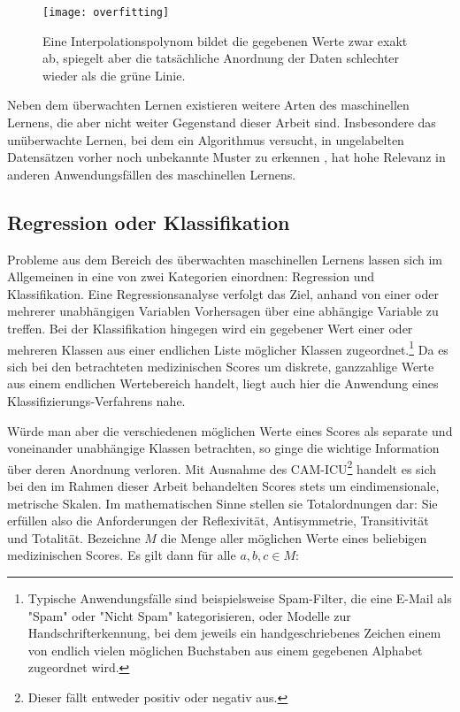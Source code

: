 \begin{figure}[htb]
    \centering
    \texttt{[image: overfitting]}
    \caption{Eine Interpolationspolynom bildet die gegebenen Werte zwar exakt ab, spiegelt aber die tatsächliche Anordnung der Daten schlechter wieder als die grüne Linie.}
    \label{fig:overfitting}
\end{figure} %

Neben dem überwachten Lernen existieren weitere Arten des maschinellen Lernens, die aber nicht weiter Gegenstand dieser Arbeit sind. Insbesondere das unüberwachte Lernen, bei dem ein Algorithmus versucht, in ungelabelten Datensätzen vorher noch unbekannte Muster zu erkennen \citep{russellArtificialIntelligenceModern2020}, hat hohe Relevanz in anderen Anwendungsfällen des maschinellen Lernens.

\subsection{Regression oder Klassifikation}\label{section:regrvsclf}
Probleme aus dem Bereich des überwachten maschinellen Lernens lassen sich im Allgemeinen in eine von zwei Kategorien einordnen: Regression und Klassifikation. Eine Regressionsanalyse verfolgt das Ziel, anhand von einer oder mehrerer unabhängigen Variablen Vorhersagen über eine abhängige Variable zu treffen. Bei der Klassifikation hingegen wird ein gegebener Wert einer oder mehreren Klassen aus einer endlichen Liste möglicher Klassen zugeordnet.\footnote{Typische Anwendungsfälle sind beispielsweise Spam-Filter, die eine E-Mail als "Spam" oder "Nicht Spam" kategorisieren, oder Modelle zur Handschrifterkennung, bei dem jeweils ein handgeschriebenes Zeichen einem von endlich vielen möglichen Buchstaben aus einem gegebenen Alphabet zugeordnet wird.}
Da es sich bei den betrachteten medizinischen Scores um diskrete, ganzzahlige Werte aus einem endlichen Wertebereich handelt, liegt auch hier die Anwendung eines Klassifizierungs-Verfahrens nahe.

Würde man aber die verschiedenen möglichen Werte eines Scores als separate und voneinander unabhängige Klassen betrachten, so ginge die wichtige Information über deren Anordnung verloren. Mit Ausnahme des CAM-ICU\footnote{Dieser fällt entweder positiv oder negativ aus.} handelt es sich bei den im Rahmen dieser Arbeit behandelten Scores stets um eindimensionale, metrische Skalen. Im mathematischen Sinne stellen sie Totalordnungen dar: Sie erfüllen also die Anforderungen der Reflexivität, Antisymmetrie, Transitivität und Totalität. Bezeichne $M$ die Menge aller möglichen Werte eines beliebigen medizinischen Scores. Es gilt dann für alle $a,b,c \in M$:

